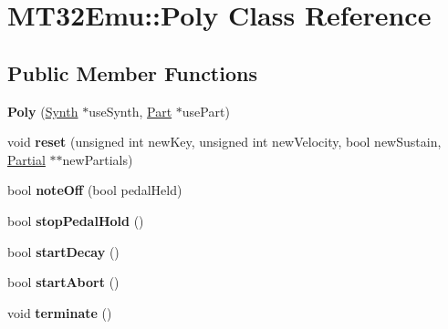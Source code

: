 \hypertarget{classMT32Emu_1_1Poly}{\section{M\-T32\-Emu\-:\-:Poly Class Reference}
\label{classMT32Emu_1_1Poly}
}
\subsection*{Public Member Functions}
\begin{DoxyCompactItemize}
\item 
\hypertarget{classMT32Emu_1_1Poly_afb848e178236dff686db60b5a682abae}{{\bfseries Poly} (\hyperlink{classMT32Emu_1_1Synth}{Synth} $\ast$use\-Synth, \hyperlink{classMT32Emu_1_1Part}{Part} $\ast$use\-Part)}\label{classMT32Emu_1_1Poly_afb848e178236dff686db60b5a682abae}

\item 
\hypertarget{classMT32Emu_1_1Poly_a7f7c87a568ab33db4e20b2d8c803501c}{void {\bfseries reset} (unsigned int new\-Key, unsigned int new\-Velocity, bool new\-Sustain, \hyperlink{classMT32Emu_1_1Partial}{Partial} $\ast$$\ast$new\-Partials)}\label{classMT32Emu_1_1Poly_a7f7c87a568ab33db4e20b2d8c803501c}

\item 
\hypertarget{classMT32Emu_1_1Poly_a0ad7f5d7e7f95769c47610355149513a}{bool {\bfseries note\-Off} (bool pedal\-Held)}\label{classMT32Emu_1_1Poly_a0ad7f5d7e7f95769c47610355149513a}

\item 
\hypertarget{classMT32Emu_1_1Poly_a3b839a952541e8bc964947cb3fc6a107}{bool {\bfseries stop\-Pedal\-Hold} ()}\label{classMT32Emu_1_1Poly_a3b839a952541e8bc964947cb3fc6a107}

\item 
\hypertarget{classMT32Emu_1_1Poly_a01582ab16b2130191ba05200ff653796}{bool {\bfseries start\-Decay} ()}\label{classMT32Emu_1_1Poly_a01582ab16b2130191ba05200ff653796}

\item 
\hypertarget{classMT32Emu_1_1Poly_a131eef106138ff8091cbbefce42ee3a1}{bool {\bfseries start\-Abort} ()}\label{classMT32Emu_1_1Poly_a131eef106138ff8091cbbefce42ee3a1}

\item 
\hypertarget{classMT32Emu_1_1Poly_a2c710523168e79cdee9c8c92b5211f33}{void {\bfseries terminate} ()}\label{classMT32Emu_1_1Poly_a2c710523168e79cdee9c8c92b5211f33}


\end{DoxyCompactItemize}
